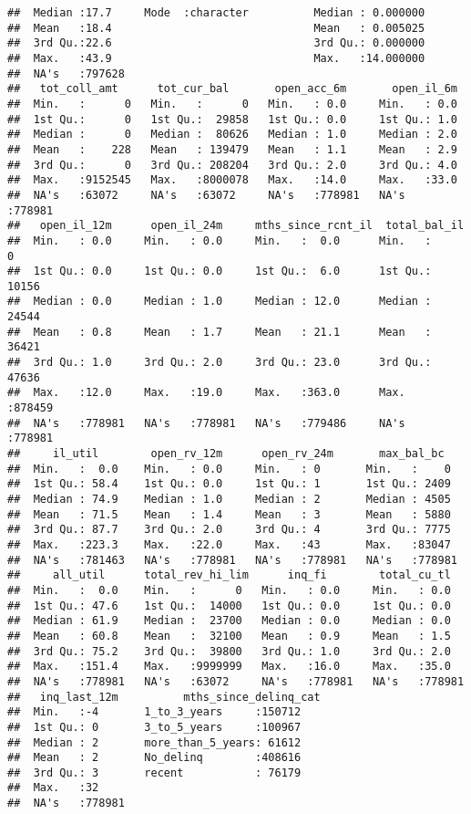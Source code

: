 \documentclass[
]{article}
\begin{document}
\begin{verbatim}
##  Median :17.7     Mode  :character          Median : 0.000000  
##  Mean   :18.4                               Mean   : 0.005025  
##  3rd Qu.:22.6                               3rd Qu.: 0.000000  
##  Max.   :43.9                               Max.   :14.000000  
##  NA's   :797628                                                
##   tot_coll_amt      tot_cur_bal       open_acc_6m       open_il_6m    
##  Min.   :      0   Min.   :      0   Min.   : 0.0     Min.   : 0.0    
##  1st Qu.:      0   1st Qu.:  29858   1st Qu.: 0.0     1st Qu.: 1.0    
##  Median :      0   Median :  80626   Median : 1.0     Median : 2.0    
##  Mean   :    228   Mean   : 139479   Mean   : 1.1     Mean   : 2.9    
##  3rd Qu.:      0   3rd Qu.: 208204   3rd Qu.: 2.0     3rd Qu.: 4.0    
##  Max.   :9152545   Max.   :8000078   Max.   :14.0     Max.   :33.0    
##  NA's   :63072     NA's   :63072     NA's   :778981   NA's   :778981  
##   open_il_12m      open_il_24m     mths_since_rcnt_il  total_bal_il   
##  Min.   : 0.0     Min.   : 0.0     Min.   :  0.0      Min.   :     0  
##  1st Qu.: 0.0     1st Qu.: 0.0     1st Qu.:  6.0      1st Qu.: 10156  
##  Median : 0.0     Median : 1.0     Median : 12.0      Median : 24544  
##  Mean   : 0.8     Mean   : 1.7     Mean   : 21.1      Mean   : 36421  
##  3rd Qu.: 1.0     3rd Qu.: 2.0     3rd Qu.: 23.0      3rd Qu.: 47636  
##  Max.   :12.0     Max.   :19.0     Max.   :363.0      Max.   :878459  
##  NA's   :778981   NA's   :778981   NA's   :779486     NA's   :778981  
##     il_util        open_rv_12m      open_rv_24m       max_bal_bc    
##  Min.   :  0.0    Min.   : 0.0     Min.   : 0       Min.   :    0   
##  1st Qu.: 58.4    1st Qu.: 0.0     1st Qu.: 1       1st Qu.: 2409   
##  Median : 74.9    Median : 1.0     Median : 2       Median : 4505   
##  Mean   : 71.5    Mean   : 1.4     Mean   : 3       Mean   : 5880   
##  3rd Qu.: 87.7    3rd Qu.: 2.0     3rd Qu.: 4       3rd Qu.: 7775   
##  Max.   :223.3    Max.   :22.0     Max.   :43       Max.   :83047   
##  NA's   :781463   NA's   :778981   NA's   :778981   NA's   :778981  
##     all_util      total_rev_hi_lim      inq_fi        total_cu_tl    
##  Min.   :  0.0    Min.   :      0   Min.   : 0.0     Min.   : 0.0    
##  1st Qu.: 47.6    1st Qu.:  14000   1st Qu.: 0.0     1st Qu.: 0.0    
##  Median : 61.9    Median :  23700   Median : 0.0     Median : 0.0    
##  Mean   : 60.8    Mean   :  32100   Mean   : 0.9     Mean   : 1.5    
##  3rd Qu.: 75.2    3rd Qu.:  39800   3rd Qu.: 1.0     3rd Qu.: 2.0    
##  Max.   :151.4    Max.   :9999999   Max.   :16.0     Max.   :35.0    
##  NA's   :778981   NA's   :63072     NA's   :778981   NA's   :778981  
##   inq_last_12m          mths_since_delinq_cat
##  Min.   :-4       1_to_3_years     :150712   
##  1st Qu.: 0       3_to_5_years     :100967   
##  Median : 2       more_than_5_years: 61612   
##  Mean   : 2       No_delinq        :408616   
##  3rd Qu.: 3       recent           : 76179   
##  Max.   :32                                  
##  NA's   :778981
\end{verbatim}
\end{document}
